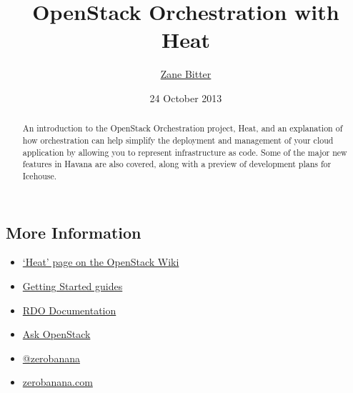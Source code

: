 \documentclass{tufte-handout}
\title{OpenStack Orchestration with Heat}
\author{\href{mailto:zbitter@redhat.com}{Zane Bitter}}
\date{24 October 2013}
\begin{document}
\maketitle

\marginnote{\tableofcontents \vspace{2em}}

\begin{abstract}
An introduction to the OpenStack Orchestration project, Heat, and an explanation of how orchestration can help simplify the deployment and management of your cloud application by allowing you to represent infrastructure as code. Some of the major new features in Havana are also covered, along with a preview of development plans for Icehouse.
\end{abstract}











\begin{marginfigure}
\section{More Information}
\begin{itemize}
\item \href{https://wiki.openstack.org/Heat}{`Heat' page on the OpenStack Wiki}
\item \href{http://docs.openstack.org/developer/heat/#getting-started}{Getting Started guides}
\item \href{http://openstack.redhat.com/Docs}{RDO Documentation}
\item \href{https://ask.openstack.org/}{Ask OpenStack}
\item \href{https://twitter.com/zerobanana}{@zerobanana}
\item \href{http://www.zerobanana.com/tags/OpenStack}{zerobanana.com}
\end{itemize}
\end{marginfigure}
\end{document}
